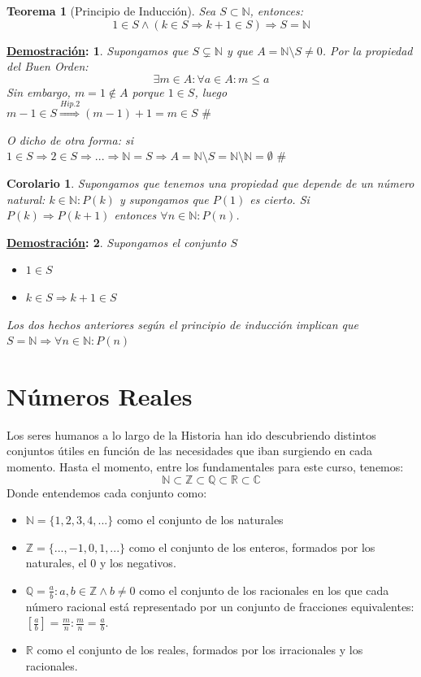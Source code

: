 \documentclass[10pt,a4paper,openright]{book}
\theoremstyle{break}
\newtheorem*{theo}{Teorema}
\newtheorem*{coro}{Corolario}
\newtheorem*{demo}{\underline{Demostración}:}
\begin{document}
\begin{theo}[Principio de Inducción]
Sea $S\subset \mathbb N$, entonces:
$$1\in S\wedge (k\in S\Rightarrow k+1\in S)\Rightarrow S=\mathbb N$$
\end{theo}
\begin{demo}
Supongamos que $S\subsetneq \mathbb N$ y que $A=\mathbb N\mbox{\textbackslash} S\neq 0$. Por la propiedad del Buen Orden:
$$\exists m \in A : \forall a \in A: m\leq a$$
Sin embargo, $m=1\notin A$ porque $1\in S$, luego $m-1\in S\stackrel{Hip. 2}{\Rightarrow} (m-1)+1=m\in S \mbox{ \#}$\par
O dicho de otra forma: si $1\in S\Rightarrow 2\in S \Rightarrow ... \Rightarrow \mathbb N=S\Rightarrow A=\mathbb N \mbox{\textbackslash} S=\mathbb N \mbox{\textbackslash} \mathbb N=\emptyset \mbox{ \#}$
\end{demo}

\begin{coro}
Supongamos que tenemos una propiedad que depende de un número natural: $k \in \mathbb N : P(k)$ y supongamos que $P(1)$ es cierto. Si $P(k)\Rightarrow P(k+1)$ entonces $\forall n \in \mathbb N : P(n)$.
\end{coro}
\begin{demo}
Supongamos el conjunto $S$
\begin{itemize}
\item $1\in S$
\item $k\in S\Rightarrow k+1\in S$
\end{itemize}
Los dos hechos anteriores según el principio de inducción implican que $S=\mathbb N\Rightarrow \forall n \in \mathbb N : P(n)$
\end{demo}

\chapter{Números Reales}
Los seres humanos a lo largo de la Historia han ido descubriendo distintos conjuntos útiles en función de las necesidades que iban surgiendo en cada momento. Hasta el momento, entre los fundamentales para este curso, tenemos:
$$\mathbb N\subset \mathbb Z\subset \mathbb Q\subset \mathbb R\subset \mathbb C$$
Donde entendemos cada conjunto como:
\begin{itemize}
\item $\mathbb N = \{1,2,3,4,...\}$ como el conjunto de los naturales
\item $\mathbb Z = \{..., -1, 0 ,1, ...\}$ como el conjunto de los enteros, formados por los naturales, el 0 y los negativos.
\item $\mathbb Q={\frac{a}{b}: a,b\in \mathbb Z \wedge b\neq 0}$ como el conjunto de los racionales en los que cada número racional está representado por un conjunto de fracciones equivalentes: $[\frac{a}{b}]={\frac{m}{n}: \frac{m}{n}=\frac{a}{b}}$.
\item $\mathbb{R}$ como el conjunto de los reales, formados por los irracionales y los racionales.
\end{itemize}
\end{document}
